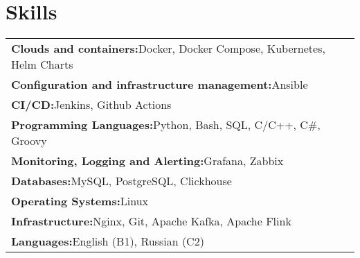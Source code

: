 \documentclass[a4paper,12pt]{article}
\begin{document}
    \section{Skills}
    \renewcommand{\arraystretch}{1.1}
    \begin{tabularx}{\linewidth}{@{}l X@{}}
        \textbf{Clouds and containers:}\quad Docker, \quad Docker Compose, \quad Kubernetes, \quad Helm Charts \\
        \textbf{Configuration and infrastructure management:}\quad Ansible \\
        \textbf{CI/CD:}\quad Jenkins, \quad Github Actions \\
        \textbf{Programming Languages:}\quad Python, \quad Bash, \quad SQL, \quad C/C++, \quad C\#, \quad Groovy \\
        \textbf{Monitoring, Logging and Alerting:}\quad Grafana, \quad Zabbix \\
        \textbf{Databases:}\quad MySQL, \quad PostgreSQL, \quad Clickhouse \\
        \textbf{Operating Systems:}\quad Linux \\
        \textbf{Infrastructure:}\quad Nginx, \quad Git, \quad Apache Kafka, \quad Apache Flink \\
        \textbf{Languages:}\quad English (B1), \quad Russian (C2) \\
    \end{tabularx}
\end{document}
